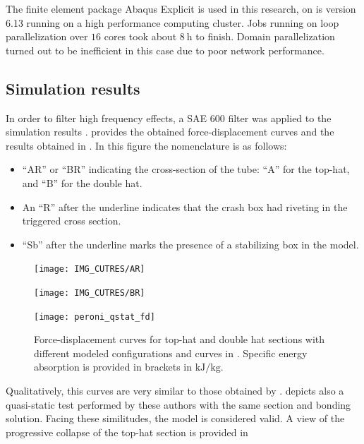 \documentclass[cmfonts]{witpress}
\begin{document}
The finite element package Abaqus Explicit is used in this research, on is version 6.13 \cite{Abaqus613Manual} running on a high performance computing cluster. Jobs running on loop parallelization over $16$ cores took about $\SI{8}{\hour}$ to finish. Domain parallelization turned out to be inefficient in this case due to poor network performance.

\subsection{Simulation results}


In order to filter high frequency effects, a SAE 600 filter was applied to the simulation results \cite{Huang}.  provides the obtained force-displacement curves and the results obtained in \cite{Peroni2009}. In this figure the nomenclature is as follows:
\begin{itemize}
	\item ``AR'' or ``BR'' indicating the cross-section of the tube: ``A'' for the top-hat, and ``B'' for the double hat.
	\item An ``R'' after the underline indicates that the crash box had riveting in the triggered cross section.
	\item ``Sb'' after the underline marks the presence of a stabilizing box in the model.
\end{itemize}

\begin{figure}[htpb]
	\centering
	\begin{minipage}[b]{.7\linewidth}
		\centering
		\texttt{[image: IMG\_CUTRES/AR]}
	\end{minipage}
	\quad
	\begin{minipage}[b]{.7\linewidth}
		\centering
		\texttt{[image: IMG\_CUTRES/BR]}
	\end{minipage}
	\quad
	\begin{minipage}[b]{.7\linewidth}
		\centering
		\texttt{[image: peroni\_qstat\_fd]}
	\end{minipage}	
	\caption[Force-displacement curves for top-hat and double hat sections with different modeled configurations.]{Force-displacement curves for top-hat and double hat sections with different modeled configurations and curves in \cite{Peroni2009}. Specific energy absorption is provided in brackets in $\si{\kJ/\kg}$.}
	\label{fig:F-D_rough}
\end{figure}

Qualitatively, this curves are very similar to those obtained by \cite{Peroni2009}.  depicts also a quasi-static test performed by these authors with the same section and bonding solution. Facing these similitudes, the model is considered valid. A view of the progressive collapse of the top-hat section is provided in 
\end{document}

